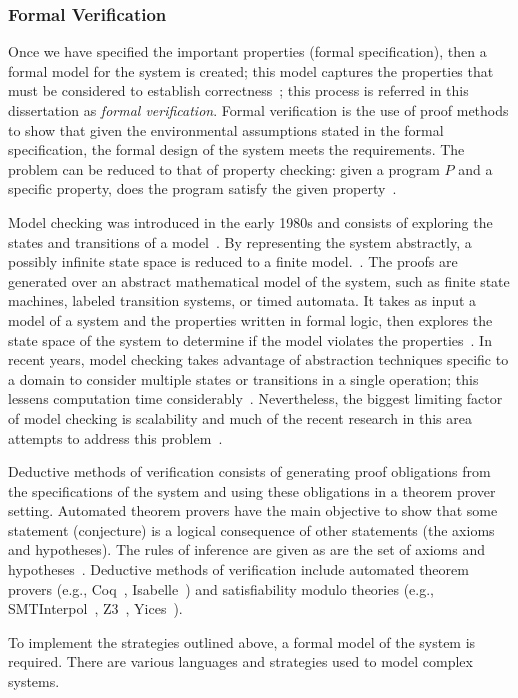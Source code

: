 \subsubsection{Formal Verification} 
\label{sec:formalVer}
Once we have specified the important properties (formal specification), then a formal model for the system is created; this model captures the properties that must be considered to establish correctness~\cite{clarke2018model}; this process is referred in this dissertation as \emph{formal verification}. Formal verification is the use of proof methods to show that given the environmental assumptions stated in the formal specification, the formal design of the system meets the requirements. The problem can be reduced to that of property checking: given a program $P$ and a specific property, does the program satisfy the given property~\cite{fitting2012first}.  

Model checking was introduced in the early 1980s and consists of exploring the states and transitions of a model~\cite{clarke1981design,queille1982specification}. By representing the system abstractly, a possibly infinite state space is reduced to a finite model.~\cite{d2008survey}. The proofs are generated over an abstract mathematical model of the system, such as finite state machines, labeled transition systems, or timed automata. It takes as input a model of a system and the properties written in formal logic, then explores the state space of the system to determine if the model violates the properties~\cite{clarke2018model,fraser2009testing}. In recent years, model checking takes advantage of abstraction techniques specific to a domain to consider multiple states or transitions in a single operation; this lessens computation time considerably~\cite{d2008survey}. Nevertheless, the biggest limiting factor of model checking is scalability and much of the recent research in this area attempts to address this problem~\cite{clarke2018model}.

Deductive methods of verification consists of generating proof obligations from the specifications of the system and using these obligations in a theorem prover setting. Automated theorem provers have the main objective to show that some statement (conjecture) is a logical consequence of other statements (the axioms and hypotheses). The rules of inference are given as are the set of axioms and hypotheses~\cite{d2008survey,fitting2012first}. Deductive methods of verification include automated theorem provers (e.g., Coq~\cite{coq}, Isabelle~\cite{isabelle}) and satisfiability modulo theories (e.g., SMTInterpol~\cite{smtInterpol}, Z3~\cite{z3}, Yices~\cite{yices}). 

To implement the strategies outlined above, a formal model of the system is required. There are various languages and strategies used to model complex systems. 